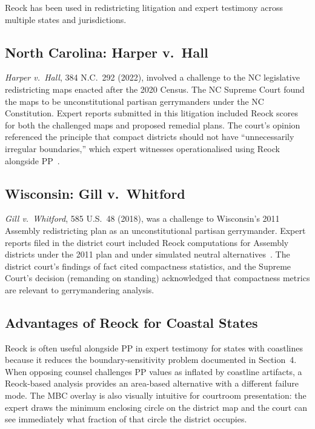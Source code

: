 Reock has been used in redistricting litigation and expert testimony across
multiple states and jurisdictions.

\subsection{North Carolina: Harper v.\ Hall}

\textit{Harper v.\ Hall}, 384 N.C.\ 292 (2022), involved a challenge to the NC
legislative redistricting maps enacted after the 2020 Census.
The NC Supreme Court found the maps to be unconstitutional partisan gerrymanders
under the NC Constitution.
Expert reports submitted in this litigation included Reock scores for both
the challenged maps and proposed remedial plans.
The court's opinion referenced the principle that compact districts should
not have ``unnecessarily irregular boundaries,'' which expert witnesses operationalised
using Reock alongside PP~\citep{harper2022}.

\subsection{Wisconsin: Gill v.\ Whitford}

\textit{Gill v.\ Whitford}, 585 U.S.\ 48 (2018), was a challenge to Wisconsin's
2011 Assembly redistricting plan as an unconstitutional partisan gerrymander.
Expert reports filed in the district court included Reock computations for
Assembly districts under the 2011 plan and under simulated neutral alternatives~\citep{gill2018}.
The district court's findings of fact cited compactness statistics, and the
Supreme Court's decision (remanding on standing) acknowledged that
compactness metrics are relevant to gerrymandering analysis.

\subsection{Advantages of Reock for Coastal States}

Reock is often useful alongside PP in expert testimony for states with coastlines
because it reduces the boundary-sensitivity problem documented in Section~4.
When opposing counsel challenges PP values as inflated by coastline artifacts,
a Reock-based analysis provides an area-based alternative with a different
failure mode.
The MBC overlay is also visually intuitive for courtroom presentation:
the expert draws the minimum enclosing circle on the district map and the
court can see immediately what fraction of that circle the district occupies.

